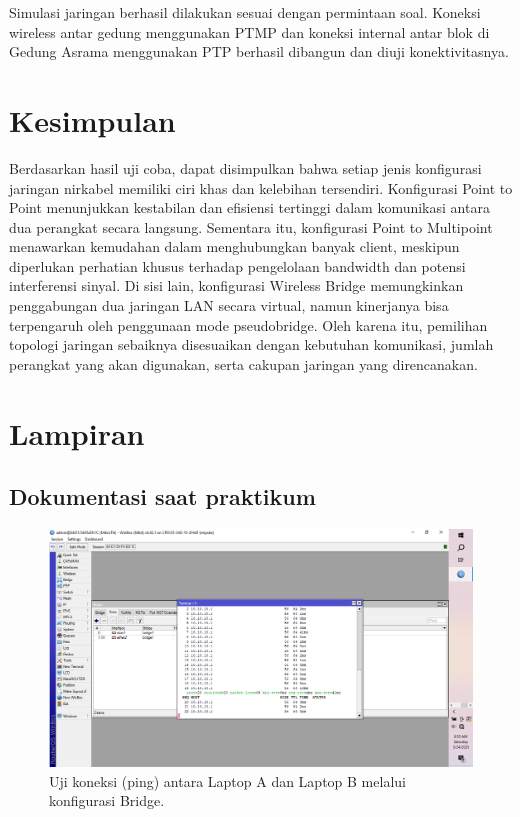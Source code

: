 Simulasi jaringan berhasil dilakukan sesuai dengan permintaan soal. Koneksi wireless antar gedung menggunakan PTMP dan koneksi internal antar blok di Gedung Asrama menggunakan PTP berhasil dibangun dan diuji konektivitasnya.

\section{Kesimpulan}
Berdasarkan hasil uji coba, dapat disimpulkan bahwa setiap jenis konfigurasi jaringan nirkabel memiliki ciri khas dan kelebihan tersendiri. Konfigurasi Point to Point menunjukkan kestabilan dan efisiensi tertinggi dalam komunikasi antara dua perangkat secara langsung. Sementara itu, konfigurasi Point to Multipoint menawarkan kemudahan dalam menghubungkan banyak client, meskipun diperlukan perhatian khusus terhadap pengelolaan bandwidth dan potensi interferensi sinyal. Di sisi lain, konfigurasi Wireless Bridge memungkinkan penggabungan dua jaringan LAN secara virtual, namun kinerjanya bisa terpengaruh oleh penggunaan mode pseudobridge. Oleh karena itu, pemilihan topologi jaringan sebaiknya disesuaikan dengan kebutuhan komunikasi, jumlah perangkat yang akan digunakan, serta cakupan jaringan yang direncanakan.

\section{Lampiran}
\subsection{Dokumentasi saat praktikum}
    \begin{figure}[H]
        \centering
        \includegraphics[width=0.5\linewidth]{P3/img/ping3.png}
        \caption{Uji koneksi (ping) antara Laptop A dan Laptop B melalui konfigurasi Bridge.}
        \label{fig:ping-bridge}
    \end{figure}

